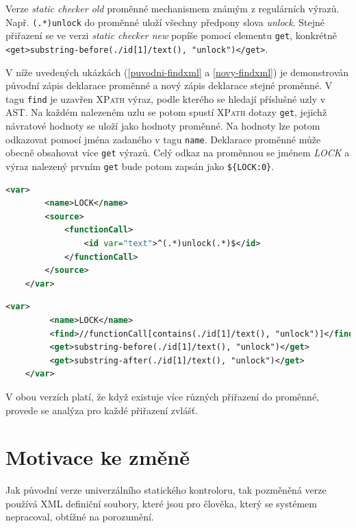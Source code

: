 \documentclass[11pt,final,oneside]{fithesis}
\begin{document}
Verze \textit{static checker old}  proměnné mechanismem známým z regulárních výrazů. Např. \texttt{(.*)unlock} do proměnné uloží všechny předpony slova \textit{unlock}. Stejné přiřazení se ve verzi \textit{static checker new} popíše pomocí elementu \texttt{get}, konkrétně \lstinline{<get>substring-before(./id[1]/text(), "unlock")</get>}.
 
V níže uvedených ukázkách (\ref{puvodni-findxml} a \ref{novy-findxml}) je demonstrován původní zápis deklarace proměnné a nový zápis deklarace stejné proměnné. V tagu \texttt{find} je uzavřen \textsc{XPath} výraz, podle kterého se hledají příslušné uzly v AST. Na každém nalezeném uzlu se potom spustí \textsc{XPath} dotazy \texttt{get}, jejichž návratové hodnoty se uloží jako hodnoty proměnné. Na hodnoty lze potom odkazovat pomocí jména zadaného v tagu \texttt{name}. Deklarace proměnné může obecně obsahovat více \texttt{get} výrazů. Celý odkaz na proměnnou se jménem \textit{LOCK} a výraz nalezený prvním \texttt{get} bude potom zapsán jako \verb|${LOCK:0}|.


\begin{lstlisting}[language=XML,caption=Zápis hledaného fragmentu v \textit{static checker old},label=puvodni-findxml]
    <var>
        <name>LOCK</name>
        <source>
            <functionCall>
                <id var="text">^(.*)unlock(.*)$</id>
            </functionCall>
        </source>
    </var>
\end{lstlisting}


\begin{lstlisting}[language=XML,caption=Zápis hledaného fragmentu v \textit{static checker new},label=novy-findxml]
    <var>
         <name>LOCK</name>
         <find>//functionCall[contains(./id[1]/text(), "unlock")]</find>
         <get>substring-before(./id[1]/text(), "unlock")</get>
         <get>substring-after(./id[1]/text(), "unlock")</get>
    </var>
\end{lstlisting}

V obou verzích platí, že když existuje více různých přiřazení do proměnné, provede se analýza pro každé přiřazení zvlášť. 


\section{Motivace ke změně}

Jak původní verze univerzálního statického kontroloru, tak pozměněná verze používá XML definiční soubory, které jsou pro člověka, který se systémem nepracoval, obtížné na porozumění. 
\end{document}
